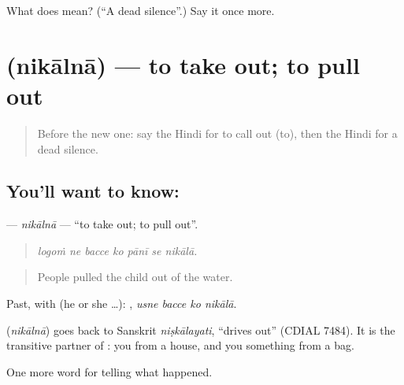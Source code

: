 \begin{tcolorbox}[breakable,colback=teal!4,colframe=teal!35!black,title={Before you move on}]
What does  mean? (\textquotedblleft{}A dead silence\textquotedblright{}.) Say it once more.
\end{tcolorbox}
\section[\texorpdfstring{\hi{निकालना} (nikālnā)}{निकालना (nikālnā)}]{ (nikālnā) — to take out; to pull out}

\label{lesson:HI-C307-nikalna}



\begin{quote}
Before the new one: say the Hindi for to call out (to), then the Hindi for a dead silence.
\end{quote}

\subsection*{You'll want to know: }
\textbf{} — \emph{nikālnā} — \textquotedblleft{}to take out; to pull out\textquotedblright{}.

\begin{quote}
      
\end{quote}

\begin{quote}
\emph{logoṁ ne bacce ko pānī se nikālā.}
\end{quote}

\begin{quote}
People pulled the child out of the water.
\end{quote}

Past, with  (he or she …):    , \emph{usne bacce ko nikālā}.

\begin{cousinweb}
\textbf{} (\emph{nikālnā}) goes back to Sanskrit \emph{niṣkālayati}, \textquotedblleft{}drives out\textquotedblright{} (CDIAL 7484). It is the transitive partner of \textbf{}: you \textbf{ } from a house, and you \textbf{ } something from a bag.
\end{cousinweb}

\begin{grammarlens}[title={What you've built}]
One more word for telling what happened.
\end{grammarlens}

